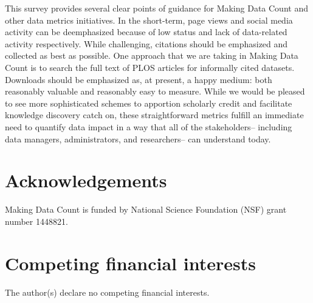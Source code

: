 \documentclass[english]{article}
\begin{document}
This survey provides several clear points of guidance for Making Data Count and other data metrics initiatives.
In the short-term, page views and social media activity can be deemphasized because of low status and lack of data-related activity respectively.
While challenging, citations should be emphasized and collected as best as possible.
One approach that we are taking in Making Data Count is to search the full text of PLOS articles for informally cited datasets.
Downloads should be emphasized as, at present, a happy medium: both reasonably valuable and reasonably easy to measure.
While we would be pleased to see more sophisticated schemes to apportion scholarly credit and facilitate knowledge discovery \cite{ingwersen_indicators_2011, ding_entitymetrics_2013, katz_transitive_2014} catch on, these straightforward metrics fulfill an immediate need to quantify data impact in a way that all of the stakeholders-- including data managers, administrators, and researchers-- can understand today.


\section*{Acknowledgements}

Making Data Count is funded by National Science Foundation (NSF) grant number 1448821.


\section*{Competing financial interests}

The author(s) declare no competing financial interests.


\end{document}
